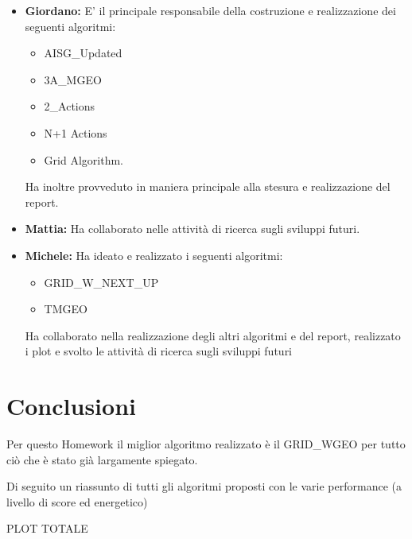 \documentclass[12pt]{article}
\begin{document}
\begin{itemize}

    \item \textbf{Giordano:} E' il principale responsabile della costruzione e realizzazione dei seguenti algoritmi:
    
    \begin{itemize}
        
        \item AISG\_Updated
        
        \item 3A\_MGEO
        
        \item 2\_Actions
        
        \item N+1 Actions
        
        \item Grid Algorithm. 
        
    \end{itemize}
    
    Ha inoltre provveduto in maniera principale alla stesura e realizzazione del report.
    
    \item \textbf{Mattia:} Ha collaborato nelle attività di ricerca sugli sviluppi futuri.
    
    \item \textbf{Michele:} Ha ideato e realizzato i seguenti algoritmi:
        \begin{itemize}
        
		\item	GRID_W_NEXT_UP
	
		\item	TMGEO
		 
	\end{itemize}
		Ha collaborato nella realizzazione degli altri algoritmi e del report, realizzato i plot e svolto le attività di ricerca sugli sviluppi futuri
    
\end{itemize}

\section{Conclusioni}

Per questo Homework il miglior algoritmo realizzato è il GRID\_WGEO per tutto ciò che è stato già largamente spiegato.

Di seguito un riassunto di tutti gli algoritmi proposti con le varie performance (a livello di score ed energetico)

PLOT TOTALE
\end{document}
